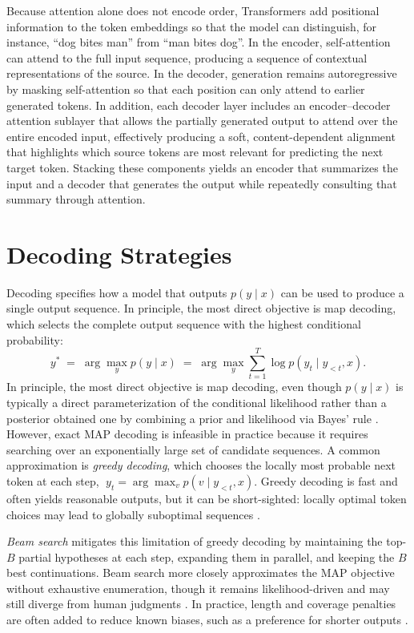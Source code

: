 Because attention alone does not encode order, Transformers add positional information to the token embeddings so that the model can distinguish, for instance, ``dog bites man'' from ``man bites dog''. In the encoder, self-attention can attend to the full input sequence, producing a sequence of contextual representations of the source. In the decoder, generation remains autoregressive by masking self-attention so that each position can only attend to earlier generated tokens. In addition, each decoder layer includes an encoder--decoder attention sublayer that allows the partially generated output to attend over the entire encoded input, effectively producing a soft, content-dependent alignment that highlights which source tokens are most relevant for predicting the next target token. Stacking these components yields an encoder that summarizes the input and a decoder that generates the output while repeatedly consulting that summary through attention.




\section{Decoding Strategies}

Decoding specifies how a model that outputs \(p(y \mid x)\) can be used to produce a single output sequence.
In principle, the most direct objective is \gls{map} decoding, which selects the complete output sequence with the highest conditional probability:
\[
y^{*} \;=\; \arg\max_{y} p(y \mid x)
\;=\; \arg\max_{y} \sum_{t=1}^{T} \log p(y_t \mid y_{<t}, x).
\]
In principle, the most direct objective is \gls{map} decoding, even though \(p(y\mid x)\) is typically a direct parameterization of the conditional likelihood rather than a posterior obtained one by combining a prior and likelihood via Bayes’ rule \cite{eikema2021beyondbeam}. However, exact MAP decoding is infeasible in practice because it requires searching over an exponentially large set of candidate sequences. A common approximation is \emph{greedy decoding}, which chooses the locally most probable next token at each step,
\(\;y_t = \arg\max_v p(v \mid y_{<t}, x)\).
Greedy decoding is fast and often yields reasonable outputs, but it can be short-sighted: locally optimal token choices may lead to globally suboptimal sequences \cite{qad_nmt_2022}. 

\emph{Beam search} mitigates this limitation of greedy decoding by maintaining the top-\(B\) partial hypotheses at each step, expanding them in parallel, and keeping the \(B\) best continuations. Beam search more closely approximates the MAP objective without exhaustive enumeration, though it remains likelihood-driven and may still diverge from human judgments \cite{qad_nmt_2022}. In practice, length and coverage penalties are often added to reduce known biases, such as a preference for shorter outputs \cite{wu2016gnmt}. 

